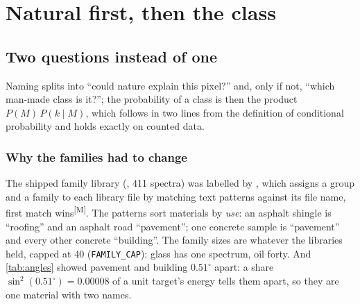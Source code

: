 \documentclass[11pt,a4paper,oneside,openany]{book}
\newcommand{\meas}{\textsuperscript{\textsf{\scriptsize[M]}}}
\begin{document}
\part{Natural first, then the class}
\label{part:twolevel}

\chapter{Two questions instead of one}
\label{ch:twolevel}

\begin{onething}
Naming splits into ``could nature explain this pixel?'' and, only if not, ``which man-made class is it?''; the probability of a class is then the product
$P(M)\,P(k\mid M)$, which follows in two lines from the definition of conditional probability and holds exactly on counted data.
\end{onething}

\section{Why the families had to change}

The shipped family library (, 411 spectra) was labelled by , which assigns a group and a
family to each library file by matching text patterns against its file name, first match wins\meas. The patterns sort materials by \emph{use}: an asphalt
shingle is ``roofing'' and an asphalt road ``pavement''; one concrete sample is ``pavement'' and every other concrete ``building''. The family sizes are whatever
the libraries held, capped at 40 (\texttt{FAMILY\_CAP}): glass has one spectrum, oil forty. And \cref{tab:angles} showed pavement and building $0.51^\circ$
apart: a share $\sin^2(0.51^\circ)=0.00008$ of a unit target's energy tells them apart, so they are one material with two names.
\end{document}
